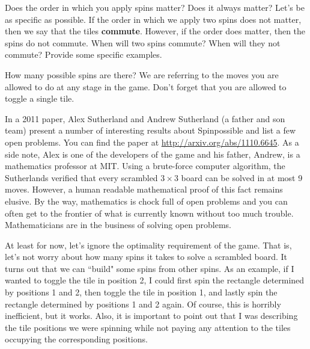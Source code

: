 \begin{exercise}
Does the order in which you apply spins matter?  Does it always matter?  Let's be as specific as possible.  If the order in which we apply two spins does not matter, then we say that the tiles \textbf{commute}.  However, if the order does matter, then the spins do not commute.  When will two spins commute?  When will they not commute?  Provide some specific examples.
\end{exercise}

\begin{exercise}\label{exer:counting_spins}
How many possible spins are there?  We are referring to the moves you are allowed to do at any stage in the game.  Don't forget that you are allowed to toggle a single tile.
\end{exercise}

In a 2011 paper, Alex Sutherland and Andrew Sutherland (a father and son team) present a number of interesting results about Spinpossible and list a few open problems. You can find the paper at \url{http://arxiv.org/abs/1110.6645}. As a side note, Alex is one of the developers of the game and his father, Andrew, is a mathematics professor at MIT. Using a brute-force computer algorithm, the Sutherlands verified that every scrambled $3\times 3$ board can be solved in at most 9 moves. However, a human readable mathematical proof of this fact remains elusive.  By the way, mathematics is chock full of open problems and you can often get to the frontier of what is currently known without too much trouble.  Mathematicians are in the business of solving open problems.

At least for now, let's ignore the optimality requirement of the game.  That is, let's not worry about how many spins it takes to solve a scrambled board.  It turns out that we can ``build" some spins from other spins.  As an example, if I wanted to toggle the tile in position 2, I could first spin the rectangle determined by positions 1 and 2, then toggle the tile in position 1, and lastly spin the rectangle determined by positions 1 and 2 again.  Of course, this is horribly inefficient, but it works.  Also, it is important to point out that I was describing the tile positions we were spinning while not paying any attention to the tiles occupying the corresponding positions.

